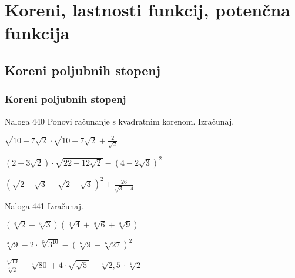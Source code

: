 \section{Koreni, lastnosti funkcij, potenčna funkcija}

\begin{frame}
    \sectionpage
\end{frame}

\begin{frame}
\end{frame}

    \subsection{Koreni poljubnih stopenj}

        \begin{frame}
            \frametitle{Koreni poljubnih stopenj}
        \end{frame}

        \begin{frame}
            \begin{exampleblock}{Naloga 440}
                Ponovi računanje s kvadratnim korenom. Izračunaj.
                \begin{description}
                    \item<2->[(d)] $\displaystyle\sqrt{10+7\sqrt{2}}\cdot\sqrt{10-7\sqrt{2}}+\frac{2}{\sqrt{2}}$
                    \item<3->[(f)] $\displaystyle\left(2+3\sqrt{2}\right)\cdot\sqrt{22-12\sqrt{2}}-\left(4-2\sqrt{3}\right)^2$
                    \item<4->[(h)] $\displaystyle\left(\sqrt{2+\sqrt{3}}-\sqrt{2-\sqrt{3}}\right)^2+\frac{26}{\sqrt{3}-4} $  
                \end{description}
            \end{exampleblock}
        \end{frame}

        \begin{frame}
            \begin{exampleblock}{Naloga 441}
                Izračunaj.
                \begin{description}
                    \item<2->[(c)] $\displaystyle \left(\sqrt[3]{2}-\sqrt[3]{3}\right)\left(\sqrt[3]{4}+\sqrt[3]{6}+\sqrt[3]{9}\right)$
                    \item<3->[(e)] $\displaystyle \sqrt[3]{9}-2\cdot\sqrt[12]{3^{10}}-\left(\sqrt[6]{9}-\sqrt[6]{27}\right)^2$
                    \item<4->[(h)] $\displaystyle \frac{\sqrt[4]{10}}{\sqrt[4]{2}}-\sqrt[4]{80}+4\cdot\sqrt{\sqrt{5}}-\sqrt[4]{2,5}\cdot\sqrt[4]{2}$   
                \end{description}
            \end{exampleblock}
        \end{frame}

